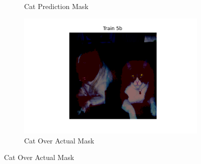 \documentclass{article}
\begin{document}
\begin{figure}[h]
\begin{subfigure}[b]{0.45\textwidth}
  \caption{Cat Prediction Mask}
\end{subfigure}
\hfill %
\begin{subfigure}[b]{0.45\textwidth}
  \centering
  \includegraphics[width=\textwidth]{include/best model/cat1_over_actual.png} %
  \caption{Cat Over Actual Mask}
\end{subfigure}
  \label{fig:best_models1}
\end{figure}
\end{document}
